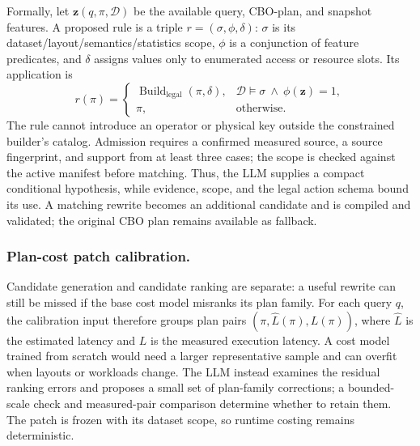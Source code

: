 Formally, let $\mathbf{z}(q,\pi,\mathcal{D})$ be the available query, CBO-plan, and snapshot features. A proposed rule is a triple $r=(\sigma,\phi,\delta)$: $\sigma$ is its dataset/layout/semantics/statistics scope, $\phi$ is a conjunction of feature predicates, and $\delta$ assigns values only to enumerated access or resource slots. Its application is
\begin{equation}\label{eq:method-rule}
 r(\pi)=\begin{cases}
   \operatorname{Build}_{\mathrm{legal}}(\pi,\delta), & \mathcal{D}\models\sigma\ \land\ \phi(\mathbf{z})=1,\\
   \pi, & \text{otherwise}.
 \end{cases}
\end{equation}
The rule cannot introduce an operator or physical key outside the constrained builder's catalog. Admission requires a confirmed measured source, a source fingerprint, and support from at least three cases; the scope is checked against the active manifest before matching. Thus, the LLM supplies a compact conditional hypothesis, while evidence, scope, and the legal action schema bound its use. A matching rewrite becomes an additional candidate and is compiled and validated; the original CBO plan remains available as fallback.

\subsubsection{Plan-cost patch calibration.}
Candidate generation and candidate ranking are separate: a useful rewrite can still be missed if the base cost model misranks its plan family. For each query $q$, the calibration input therefore groups plan pairs $(\pi,\widehat{L}(\pi),L(\pi))$, where $\widehat{L}$ is the estimated latency and $L$ is the measured execution latency. A cost model trained from scratch would need a larger representative sample and can overfit when layouts or workloads change. The LLM instead examines the residual ranking errors and proposes a small set of plan-family corrections; a bounded-scale check and measured-pair comparison determine whether to retain them. The patch is frozen with its dataset scope, so runtime costing remains deterministic.

